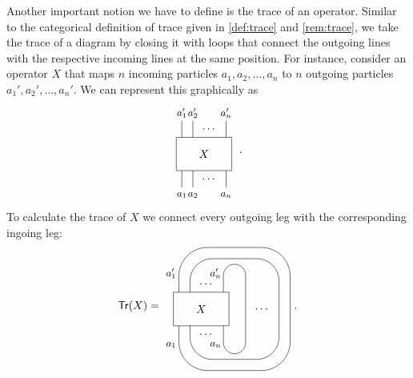 Another important notion we have to define is the trace of an operator. Similar to the categorical definition of trace given in \cref{def:trace} and \cref{rem:trace}, we take the trace of a diagram by closing it with loops that connect the outgoing lines with the respective incoming lines at the same position. For instance, consider an operator $X$ that maps $n$ incoming particles $a_1,a_2,\dots,a_n$ to $n$ outgoing particles $a_1',a_2',\dots,a_n'$. We can represent this graphically as
	\begin{equation}
		\begin{tikzpicture}[scale=0.7,baseline=(current bounding box.center)]
			\draw (0,0) rectangle (2.5,1.5);
			\node at (1.25,0.75) {$X$};
			\draw (0.25,-0.75) -- (0.25,0);
			\draw (0.75,-0.75) -- (0.75,0);
			\draw (2.25,-0.75) -- (2.25,0);
			\node at (1.5,-0.375) {$\dots$};
			\draw (0.25,2.25) -- (0.25,1.5);
			\draw (0.75,2.25) -- (0.75,1.5);
			\draw (2.25,2.25) -- (2.25,1.5);
			\node at (1.5,1.875) {$\dots$};
			\node at (0.25,-1.1) {\small $a_1$};
			\node at (0.75,-1.1) {\small $a_2$};
			\node at (2.25,-1.1) {\small $a_n$};
			\node at (0.25,2.6) {\small $a'_1$};
			\node at (0.75,2.6) {\small $a'_2$};
			\node at (2.25,2.6) {\small $a'_n$};
		\end{tikzpicture}\ .
	\end{equation}
To calculate the trace of $X$ we connect every outgoing leg with the corresponding ingoing leg:
	\begin{equation}
	\Tr(X)=
		\begin{tikzpicture}[scale=0.7,baseline=(current bounding box.center)]
			\draw (0,0) rectangle (2.5,1.5);
			\node at (1.25,0.75) {$X$};
			\draw (2.25,-0.75) -- (2.25,0);
			\node at (1.5,-0.375) {$\dots$};
			\draw (2.25,2.25) -- (2.25,1.5);
			\node at (1.5,1.875) {$\dots$};
			\node at (-0.1,-0.85) {\small $a_1$};
			\node at (1.9,-0.85) {\small $a_n$};
			\node at (-0.1,2.35) {\small $a'_1$};
			\node at (1.9,2.35) {\small $a'_n$};
			\draw (2.25,2.25) arc (180:0:0.5cm);
			\draw (2.25,-0.75) arc (-180:0:0.5cm);
			\draw (3.25,2.25) -- (3.25,-0.75);
			\node at (4,0.75) {$\dots$};
			\draw[rounded corners=7mm] (0.75,1.5) -- (0.75,3) -- (4.75,3) -- (4.75,-1.5) -- (0.75,-1.5) -- (0.75,0);
			\draw[rounded corners=9mm] (0.25,1.5) -- (0.25,3.5) -- (5.25,3.5) -- (5.25,-2) -- (0.25,-2) -- (0.25,0);
		\end{tikzpicture}\ .
	\end{equation}
	


